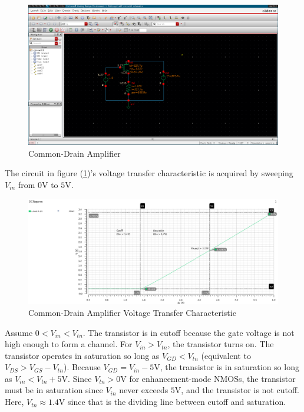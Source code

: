 
\FloatBarrier

\begin{figure}[h!]
	\centering
	\includegraphics[scale=0.30]{./images/circuit1.PNG}
	\caption{Common-Drain Amplifier}
	\label{fig:circuit1}
\end{figure}

\FloatBarrier

The circuit in figure (\ref{fig:circuit1})'s voltage transfer characteristic is acquired by sweeping $V_{in}$ from $0$\si{\volt} to $5$\si{\volt}.

\FloatBarrier

\begin{figure}[h!]
	\centering
	\includegraphics[scale=0.45]{./images/sim1_vtc.PNG}
	\caption{Common-Drain Amplifier Voltage Transfer Characteristic}
	\label{fig:sim1_vtc}
\end{figure}

\FloatBarrier
Assume $0 < V_{in} < V_{tn}$.
The transistor is in cutoff because the gate voltage is not high enough to form a channel.
For $V_{in} > V_{tn}$, the transistor turns on.
The transistor operates in saturation so long as $V_{GD} < V_{tn}$ (equivalent to $V_{DS} > V_{GS} - V_{tn}$).
Because $V_{GD} = V_{in} - 5$\si{\volt}, the transistor is in saturation so long as $V_{in} < V_{tn} + 5$\si{\volt}.
Since $V_{tn} > 0$\si{\volt} for enhancement-mode NMOSs, the transistor must be in saturation since $V_{in}$ never exceeds $5$\si{\volt}, and the transistor is not cutoff.
Here, $V_{tn} \approx 1.4$\si{\volt} since that is the dividing line between cutoff and saturation. \\

